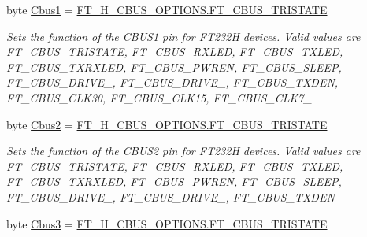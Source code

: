 \begin{DoxyCompactItemize}
byte \mbox{\hyperlink{class_f_t_d2_x_x___n_e_t_1_1_f_t_d_i_1_1_f_t232_h___e_e_p_r_o_m___s_t_r_u_c_t_u_r_e_af7b038f87a89c52f8f30b46901f2023d}{Cbus1}} = \mbox{\hyperlink{class_f_t_d2_x_x___n_e_t_1_1_f_t_d_i_1_1_f_t__232_h___c_b_u_s___o_p_t_i_o_n_s_a87f6bc339ec2e6bbb3ad093eb9d38278}{F\+T\+\_\+H\+\_\+\+C\+B\+U\+S\+\_\+\+O\+P\+T\+I\+O\+N\+S.\+F\+T\+\_\+\+C\+B\+U\+S\+\_\+\+T\+R\+I\+S\+T\+A\+TE}}
\begin{DoxyCompactList}\small\item\em Sets the function of the C\+B\+U\+S1 pin for F\+T232H devices. Valid values are F\+T\+\_\+\+C\+B\+U\+S\+\_\+\+T\+R\+I\+S\+T\+A\+TE, F\+T\+\_\+\+C\+B\+U\+S\+\_\+\+R\+X\+L\+ED, F\+T\+\_\+\+C\+B\+U\+S\+\_\+\+T\+X\+L\+ED, F\+T\+\_\+\+C\+B\+U\+S\+\_\+\+T\+X\+R\+X\+L\+ED, F\+T\+\_\+\+C\+B\+U\+S\+\_\+\+P\+W\+R\+EN, F\+T\+\_\+\+C\+B\+U\+S\+\_\+\+S\+L\+E\+EP, F\+T\+\_\+\+C\+B\+U\+S\+\_\+\+D\+R\+I\+V\+E\+\_, F\+T\+\_\+\+C\+B\+U\+S\+\_\+\+D\+R\+I\+V\+E\+\_, F\+T\+\_\+\+C\+B\+U\+S\+\_\+\+T\+X\+D\+EN, F\+T\+\_\+\+C\+B\+U\+S\+\_\+\+C\+L\+K30, F\+T\+\_\+\+C\+B\+U\+S\+\_\+\+C\+L\+K15, F\+T\+\_\+\+C\+B\+U\+S\+\_\+\+C\+L\+K7\+\_ \end{DoxyCompactList}\item 
byte \mbox{\hyperlink{class_f_t_d2_x_x___n_e_t_1_1_f_t_d_i_1_1_f_t232_h___e_e_p_r_o_m___s_t_r_u_c_t_u_r_e_a8fbe38510a9b6e917a8ee0fd84121763}{Cbus2}} = \mbox{\hyperlink{class_f_t_d2_x_x___n_e_t_1_1_f_t_d_i_1_1_f_t__232_h___c_b_u_s___o_p_t_i_o_n_s_a87f6bc339ec2e6bbb3ad093eb9d38278}{F\+T\+\_\+H\+\_\+\+C\+B\+U\+S\+\_\+\+O\+P\+T\+I\+O\+N\+S.\+F\+T\+\_\+\+C\+B\+U\+S\+\_\+\+T\+R\+I\+S\+T\+A\+TE}}
\begin{DoxyCompactList}\small\item\em Sets the function of the C\+B\+U\+S2 pin for F\+T232H devices. Valid values are F\+T\+\_\+\+C\+B\+U\+S\+\_\+\+T\+R\+I\+S\+T\+A\+TE, F\+T\+\_\+\+C\+B\+U\+S\+\_\+\+R\+X\+L\+ED, F\+T\+\_\+\+C\+B\+U\+S\+\_\+\+T\+X\+L\+ED, F\+T\+\_\+\+C\+B\+U\+S\+\_\+\+T\+X\+R\+X\+L\+ED, F\+T\+\_\+\+C\+B\+U\+S\+\_\+\+P\+W\+R\+EN, F\+T\+\_\+\+C\+B\+U\+S\+\_\+\+S\+L\+E\+EP, F\+T\+\_\+\+C\+B\+U\+S\+\_\+\+D\+R\+I\+V\+E\+\_, F\+T\+\_\+\+C\+B\+U\+S\+\_\+\+D\+R\+I\+V\+E\+\_, F\+T\+\_\+\+C\+B\+U\+S\+\_\+\+T\+X\+D\+EN \end{DoxyCompactList}\item 
byte \mbox{\hyperlink{class_f_t_d2_x_x___n_e_t_1_1_f_t_d_i_1_1_f_t232_h___e_e_p_r_o_m___s_t_r_u_c_t_u_r_e_a40ca503496d37d12d0105b886ba43f3d}{Cbus3}} = \mbox{\hyperlink{class_f_t_d2_x_x___n_e_t_1_1_f_t_d_i_1_1_f_t__232_h___c_b_u_s___o_p_t_i_o_n_s_a87f6bc339ec2e6bbb3ad093eb9d38278}{F\+T\+\_\+H\+\_\+\+C\+B\+U\+S\+\_\+\+O\+P\+T\+I\+O\+N\+S.\+F\+T\+\_\+\+C\+B\+U\+S\+\_\+\+T\+R\+I\+S\+T\+A\+TE}}

\end{DoxyCompactItemize}
